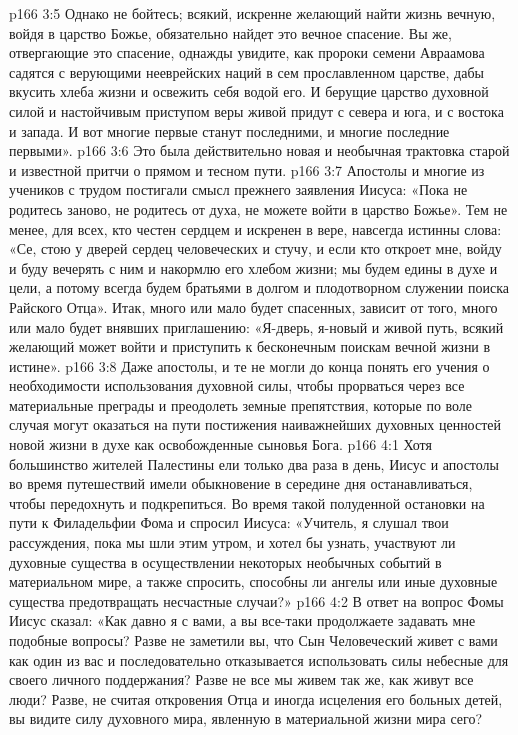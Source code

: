 \vs p166 3:5 Однако не бойтесь; всякий, искренне желающий найти жизнь вечную, войдя в царство Божье, обязательно найдет это вечное спасение. Вы же, отвергающие это спасение, однажды увидите, как пророки семени Авраамова садятся с верующими нееврейских наций в сем прославленном царстве, дабы вкусить хлеба жизни и освежить себя водой его. И берущие царство духовной силой и настойчивым приступом веры живой придут с севера и юга, и с востока и запада. И вот многие первые станут последними, и многие последние первыми».
\vs p166 3:6 Это была действительно новая и необычная трактовка старой и известной притчи о прямом и тесном пути.
\vs p166 3:7 Апостолы и многие из учеников с трудом постигали смысл прежнего заявления Иисуса: «Пока не родитесь заново, не родитесь от духа, не можете войти в царство Божье». Тем не менее, для всех, кто честен сердцем и искренен в вере, навсегда истинны слова: «Се, стою у дверей сердец человеческих и стучу, и если кто откроет мне, войду и буду вечерять с ним и накормлю его хлебом жизни; мы будем едины в духе и цели, а потому всегда будем братьями в долгом и плодотворном служении поиска Райского Отца». Итак, много или мало будет спасенных, зависит от того, много или мало будет внявших приглашению: «Я\hyp{}дверь, я\hyp{}новый и живой путь, всякий желающий может войти и приступить к бесконечным поискам вечной жизни в истине».
\vs p166 3:8 Даже апостолы, и те не могли до конца понять его учения о необходимости использования духовной силы, чтобы прорваться через все материальные преграды и преодолеть земные препятствия, которые по воле случая могут оказаться на пути постижения наиважнейших духовных ценностей новой жизни в духе как освобожденные сыновья Бога.
\vs p166 4:1 Хотя большинство жителей Палестины ели только два раза в день, Иисус и апостолы во время путешествий имели обыкновение в середине дня останавливаться, чтобы передохнуть и подкрепиться. Во время такой полуденной остановки на пути к Филадельфии Фома и спросил Иисуса: «Учитель, я слушал твои рассуждения, пока мы шли этим утром, и хотел бы узнать, участвуют ли духовные существа в осуществлении некоторых необычных событий в материальном мире, а также спросить, способны ли ангелы или иные духовные существа предотвращать несчастные случаи?»
\vs p166 4:2 \pc В ответ на вопрос Фомы Иисус сказал: «Как давно я с вами, а вы все\hyp{}таки продолжаете задавать мне подобные вопросы? Разве не заметили вы, что Сын Человеческий живет с вами как один из вас и последовательно отказывается использовать силы небесные для своего личного поддержания? Разве не все мы живем так же, как живут все люди? Разве, не считая откровения Отца и иногда исцеления его больных детей, вы видите силу духовного мира, явленную в материальной жизни мира сего?
